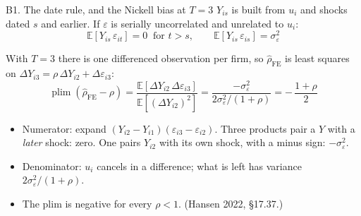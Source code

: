 \documentclass[
  11pt,
  ignorenonframetext,
  aspectratio=169,
]{beamer}
\providecommand{\tightlist}{%
  \setlength{\itemsep}{0pt}\setlength{\parskip}{0pt}}
\begin{document}
\begin{frame}{B1. The date rule, and the Nickell bias at \(T = 3\)}
\protect{}\label{b1.-the-date-rule-and-the-nickell-bias-at-t-3}
\(Y_{is}\) is built from \(u_i\) and shocks dated \(s\) and earlier. If
\(\varepsilon\) is serially uncorrelated and unrelated to \(u_i\): \[
\mathbb{E}[Y_{is}\,\varepsilon_{it}] = 0 \;\;\text{for } t > s, \qquad \mathbb{E}[Y_{is}\,\varepsilon_{is}] = \sigma^2_\varepsilon
\]

With \(T = 3\) there is one differenced observation per firm, so
\(\hat\rho_{\text{FE}}\) is least squares on
\(\Delta Y_{i3} = \rho\,\Delta Y_{i2} + \Delta\varepsilon_{i3}\): \[
\operatorname{plim}(\hat\rho_{\text{FE}} - \rho) = \frac{\mathbb{E}[\Delta Y_{i2}\,\Delta\varepsilon_{i3}]}{\mathbb{E}[(\Delta Y_{i2})^2]}
= \frac{-\sigma^2_\varepsilon}{2\sigma^2_\varepsilon/(1+\rho)} = -\,\frac{1+\rho}{2}
\]

\begin{itemize}
\tightlist
\item
  Numerator: expand
  \((Y_{i2} - Y_{i1})(\varepsilon_{i3} - \varepsilon_{i2})\). Three
  products pair a \(Y\) with a \emph{later} shock: zero. One pairs
  \(Y_{i2}\) with its own shock, with a minus sign:
  \(-\sigma^2_\varepsilon\).
\item
  Denominator: \(u_i\) cancels in a difference; what is left has
  variance \(2\sigma^2_\varepsilon/(1+\rho)\).
\item
  The plim is negative for every \(\rho < 1\). (Hansen 2022, §17.37.)
\end{itemize}
\end{frame}
\end{document}
